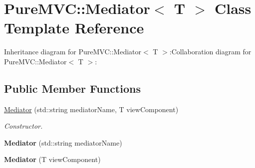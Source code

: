 \hypertarget{class_pure_m_v_c_1_1_mediator}{
\section{PureMVC::Mediator$<$ T $>$ Class Template Reference}
\label{class_pure_m_v_c_1_1_mediator}
}
Inheritance diagram for PureMVC::Mediator$<$ T $>$:Collaboration diagram for PureMVC::Mediator$<$ T $>$:\subsection*{Public Member Functions}
\begin{DoxyCompactItemize}
\item 
\hyperlink{class_pure_m_v_c_1_1_mediator_ae659a8e8b24a7023a2c4559f840e0ae5}{Mediator} (std::string mediatorName, T viewComponent)
\begin{DoxyCompactList}\small\item\em Constructor. \item\end{DoxyCompactList}\item 
\hypertarget{class_pure_m_v_c_1_1_mediator_ae758ea22df84c48b1ddb0e809a058a18}{
{\bfseries Mediator} (std::string mediatorName)}
\label{class_pure_m_v_c_1_1_mediator_ae758ea22df84c48b1ddb0e809a058a18}

\item 
\hypertarget{class_pure_m_v_c_1_1_mediator_a84696033866c7476152976a36c8f814b}{
{\bfseries Mediator} (T viewComponent)}
\label{class_pure_m_v_c_1_1_mediator_a84696033866c7476152976a36c8f814b}


\end{DoxyCompactItemize}
